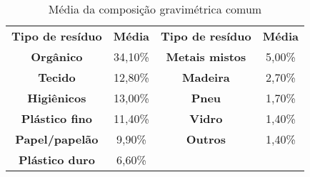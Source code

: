 \begin{table}[htbp]
  \centering
  \caption{Média da composição gravimétrica comum}
	\begin{tabular}{c|c|c|c}
		\rowcolor[rgb]{ .969,  .588,  .275} \textcolor[rgb]{ 1,  1,  1}{\textbf{Tipo de resíduo}} & \multicolumn{1}{p{4.215em}|}{\textcolor[rgb]{ 1,  1,  1}{\textbf{Média}}} & \multicolumn{1}{p{8em}|}{\textcolor[rgb]{ 1,  1,  1}{\textbf{Tipo de resíduo}}} & \multicolumn{1}{p{4.215em}}{\textcolor[rgb]{ 1,  1,  1}{\textbf{Média}}} \\
		\rowcolor[rgb]{ .992,  .914,  .851} \textbf{Orgânico} & 34,10\% & \textbf{Metais mistos} & 5,00\% \\
		\rowcolor[rgb]{ .984,  .831,  .706} \textbf{Tecido} & 12,80\% & \textbf{Madeira} & 2,70\% \\
		\rowcolor[rgb]{ .992,  .914,  .851} \textbf{Higiênicos} & 13,00\% & \textbf{Pneu} & 1,70\% \\
		\rowcolor[rgb]{ .984,  .831,  .706} \textbf{Plástico fino} & 11,40\% & \textbf{Vidro} & 1,40\% \\
		\rowcolor[rgb]{ .992,  .914,  .851} \textbf{Papel/papelão} & 9,90\% & \textbf{Outros} & 1,40\% \\
		\rowcolor[rgb]{ .984,  .831,  .706} \textbf{Plástico duro} & 6,60\% &       &  \\
	\end{tabular}%
  \label{tab:grav_comum_media}%
\end{table}%
